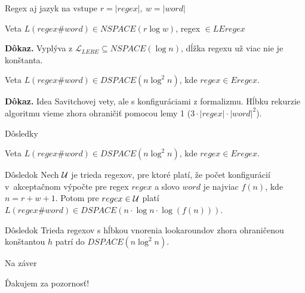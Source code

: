 \documentclass[mathserif]{beamer}
\def\e{Eregex}
\def\le{LEregex}
\def\lel{\mathscr{L}_{LERE}}
\begin{document}
\begin{frame}{Regex aj jazyk na vstupe}
$r=|regex|,~w=|word|$
\begin{block}{Veta}
$L(regex\#word) \in NSPACE(r\log w)$, regex $\in \le$
\end{block}
\textbf{Dôkaz.} Vyplýva z $\lel \subseteq NSPACE(\log n)$, dĺžka regexu už viac nie je konštanta.
\begin{block}{Veta}
$L(regex\#word) \in DSPACE(n \log^2 n)$, kde $regex \in \e$.
\end{block}
\textbf{Dôkaz.} Idea Savitchovej vety, ale s konfiguráciami z formalizmu. Hĺbku rekurzie algoritmu vieme zhora ohraničiť pomocou lemy 1 ($3\cdot|regex|\cdot|word|^2$).
\end{frame}

\begin{frame}{Dôsledky}
\begin{block}{Veta}
$L(regex\#word) \in DSPACE(n \log^2 n)$, kde $regex \in \e$.
\end{block}
\begin{block}{Dôsledok}
Nech $\cal U$ je trieda regexov, pre ktoré platí, že počet konfigurácií v~akceptačnom výpočte pre regex $regex$ a slovo $word$ je najviac $f(n)$, kde $n=r+w+1$. Potom pre $regex \in \cal U$ platí
$L(regex\#word)\in DSPACE(n\cdot\log n\cdot \log (f(n)))$.
\end{block}
\begin{block}{Dôsledok}
Trieda regexov s hĺbkou vnorenia lookaroundov zhora ohraničenou konštantou $h$ patrí do $DSPACE(n\log^2 n)$.
\end{block}
\end{frame}

\begin{frame}{Na záver}
\begin{alertblock}{}
\begin{center}
\vspace{10pt}
\large{Ďakujem za pozornosť!}
\vspace{10pt}
\end{center}
\end{alertblock}
\end{frame}
\end{document}
